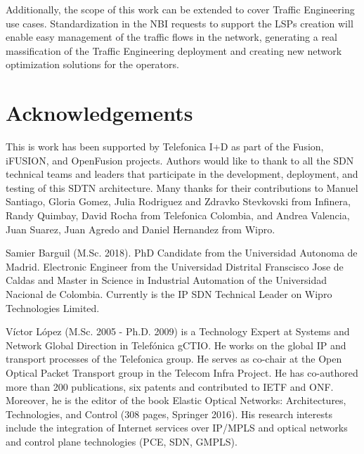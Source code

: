 \documentclass[a4paper,fleqn]{cas-dc}
\begin{document}
Additionally, the scope of this work can be extended to cover Traffic Engineering use cases. Standardization in the NBI requests to support the LSPs creation will enable easy management of the traffic flows in the network, generating a real massification of the Traffic Engineering deployment and creating new network optimization solutions for the operators.

\printcredits

\section*{Acknowledgements}
This is work has been supported by Telefonica I+D as part of the Fusion, i\uppercase{FUSION}, and OpenFusion projects. Authors would like to thank to all the SDN technical teams and leaders that participate in the development, deployment, and testing of this SDTN architecture. Many thanks for their contributions to Manuel Santiago, Gloria Gomez, Julia Rodriguez and Zdravko Stevkovski from Infinera, Randy Quimbay, David Rocha from Telefonica Colombia, and Andrea Valencia, Juan Suarez, Juan Agredo and Daniel Hernandez from Wipro.   

%
%






Samier Barguil (M.Sc. 2018). PhD Candidate from the Universidad Autonoma de Madrid. Electronic Engineer from the Universidad Distrital Franscisco Jose de Caldas and Master in Science in Industrial Automation of the Universidad Nacional de Colombia. Currently is the IP SDN Technical Leader on Wipro Technologies Limited. 
\endbio

Víctor López (M.Sc. 2005 - Ph.D. 2009) is a Technology Expert at Systems and Network Global Direction in Telefónica gCTIO. He works on the global IP and transport processes of the Telefonica group. He serves as co-chair at the Open Optical Packet Transport group in the Telecom Infra Project. He has co-authored more than 200 publications, six patents and contributed to IETF and ONF. Moreover, he is the editor of the book Elastic Optical Networks: Architectures, Technologies, and Control (308 pages, Springer 2016). His research interests include the integration of Internet services over IP/MPLS and optical networks and control plane technologies (PCE, SDN, GMPLS).
\endbio
\end{document}
